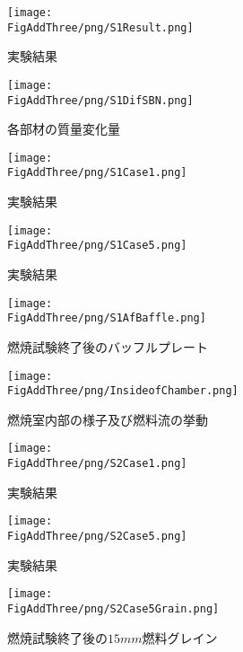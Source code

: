 \begin{figure}
\centering
\caption{実験結果}
\texttt{[image: \\FigAddThree/png/S1Result.png]}
\label{tab:S1Result}
\end{figure}

\begin{figure}
\centering
\caption{各部材の質量変化量}
\texttt{[image: \\FigAddThree/png/S1DifSBN.png]}
\label{tab:S1DifSBN}
\end{figure}

\begin{figure}
\centering
\texttt{[image: \\FigAddThree/png/S1Case1.png]}
\caption{実験結果}
\label{fig:S1Case1}
\end{figure}

\begin{figure}
\centering
\texttt{[image: \\FigAddThree/png/S1Case5.png]}
\caption{実験結果}
\label{fig:S1Case5}
\end{figure}

\begin{figure}
\centering
\texttt{[image: \\FigAddThree/png/S1AfBaffle.png]}
\caption{燃焼試験終了後のバッフルプレート}
\label{fig:S1AfBaffle}
\end{figure}

\begin{figure}
\centering
\texttt{[image: \\FigAddThree/png/InsideofChamber.png]}
\caption{燃焼室内部の様子及び燃料流の挙動}
\label{fig:InsideofChamber}
\end{figure}


\begin{figure}
\centering
\texttt{[image: \\FigAddThree/png/S2Case1.png]}
\caption{実験結果}
\label{fig:S2Case1}
\end{figure}

\begin{figure}
\centering
\texttt{[image: \\FigAddThree/png/S2Case5.png]}
\caption{実験結果}
\label{fig:S1Case5}
\end{figure}

\begin{figure}
\centering
\texttt{[image: \\FigAddThree/png/S2Case5Grain.png]}
\caption{燃焼試験終了後の$15mm$燃料グレイン}
\label{fig:S2Case5Grain}
\end{figure}
